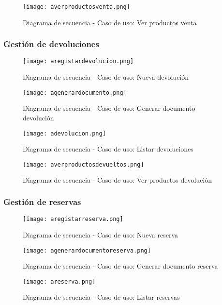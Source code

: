 \begin{figure}[!htb]
  \centering
    \texttt{[image: averproductosventa.png]}
  \caption{Diagrama de secuencia - Caso de uso: Ver productos venta }
  \label{a}
\end{figure}

\newpage
\subsubsection{Gestión de devoluciones}
\begin{figure}[!htb]
  \centering
    \texttt{[image: aregistardevolucion.png]}
  \caption{Diagrama de secuencia - Caso de uso: Nueva devolución }
  \label{a}
\end{figure}

\begin{figure}[!htb]
  \centering
    \texttt{[image: agenerardocumento.png]}
  \caption{Diagrama de secuencia - Caso de uso: Generar documento devolución}
  \label{a}
\end{figure}

\begin{figure}[!htb]
  \centering
    \texttt{[image: adevolucion.png]}
  \caption{Diagrama de secuencia - Caso de uso: Listar devoluciones }
  \label{a}
\end{figure}

\begin{figure}[!htb]
  \centering
    \texttt{[image: averproductosdevueltos.png]}
  \caption{Diagrama de secuencia - Caso de uso: Ver productos devolución  }
  \label{a}
\end{figure}

\newpage
\subsubsection{Gestión de reservas}
\begin{figure}[!htb]
  \centering
    \texttt{[image: aregistarreserva.png]}
  \caption{Diagrama de secuencia - Caso de uso: Nueva reserva }
  \label{a}
\end{figure}

\begin{figure}[!htb]
  \centering
    \texttt{[image: agenerardocumentoreserva.png]}
  \caption{Diagrama de secuencia - Caso de uso: Generar documento reserva }
  \label{a}
\end{figure}

\begin{figure}[!htb]
  \centering
    \texttt{[image: areserva.png]}
  \caption{Diagrama de secuencia - Caso de uso: Listar reservas   }
  \label{a}
\end{figure}

